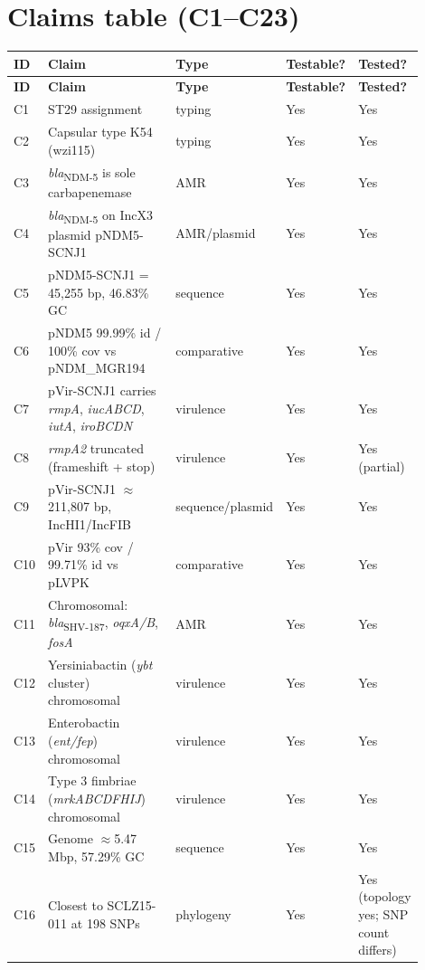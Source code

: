 \documentclass[11pt,letterpaper]{article}
\begin{document}
\section{Claims table (C1--C23)}

\begin{longtable}{@{}p{0.05\linewidth} p{0.55\linewidth} p{0.10\linewidth} p{0.10\linewidth} p{0.10\linewidth}@{}}
\toprule
\textbf{ID} & \textbf{Claim} & \textbf{Type} & \textbf{Testable?} & \textbf{Tested?} \\
\midrule
\endfirsthead
\toprule
\textbf{ID} & \textbf{Claim} & \textbf{Type} & \textbf{Testable?} & \textbf{Tested?} \\
\midrule
\endhead
C1 & ST29 assignment & typing & Yes & Yes \\
C2 & Capsular type K54 (wzi115) & typing & Yes & Yes \\
C3 & \textit{bla}\textsubscript{NDM-5} is sole carbapenemase & AMR & Yes & Yes \\
C4 & \textit{bla}\textsubscript{NDM-5} on IncX3 plasmid pNDM5-SCNJ1 & AMR/plasmid & Yes & Yes \\
C5 & pNDM5-SCNJ1 = 45{,}255 bp, 46.83\% GC & sequence & Yes & Yes \\
C6 & pNDM5 99.99\% id / 100\% cov vs pNDM\_MGR194 & comparative & Yes & Yes \\
C7 & pVir-SCNJ1 carries \textit{rmpA}, \textit{iucABCD}, \textit{iutA}, \textit{iroBCDN} & virulence & Yes & Yes \\
C8 & \textit{rmpA2} truncated (frameshift + stop) & virulence & Yes & Yes (partial) \\
C9 & pVir-SCNJ1 $\approx$211{,}807 bp, IncHI1/IncFIB & sequence/plasmid & Yes & Yes \\
C10 & pVir 93\% cov / 99.71\% id vs pLVPK & comparative & Yes & Yes \\
C11 & Chromosomal: \textit{bla}\textsubscript{SHV-187}, \textit{oqxA/B}, \textit{fosA} & AMR & Yes & Yes \\
C12 & Yersiniabactin (\textit{ybt} cluster) chromosomal & virulence & Yes & Yes \\
C13 & Enterobactin (\textit{ent/fep}) chromosomal & virulence & Yes & Yes \\
C14 & Type 3 fimbriae (\textit{mrkABCDFHIJ}) chromosomal & virulence & Yes & Yes \\
C15 & Genome $\approx$5.47 Mbp, 57.29\% GC & sequence & Yes & Yes \\
C16 & Closest to SCLZ15-011 at 198 SNPs & phylogeny & Yes & Yes (topology yes; SNP count differs) \\

\end{longtable}
\end{document}

